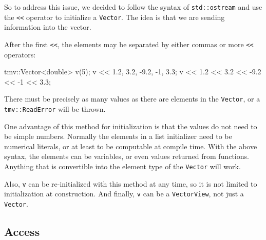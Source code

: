 \documentclass[twoside,letterpaper,11pt]{article}
\renewcommand{\tt}[1]{{\lstinline {#1}}}
\begin{document}
So to address this issue, we decided to follow the syntax of \tt{std::ostream}
and use the \tt{<<} operator to initialize a \tt{Vector}.  The idea is that we are 
sending information into the vector.  

After the first 
\tt{<<}, the elements may be separated by either commas or more \tt{<<}
operators:
\begin{tmvcode}
tmv::Vector<double> v(5);
v << 1.2, 3.2, -9.2, -1, 3.3;
v << 1.2 << 3.2 << -9.2 << -1 << 3.3;
\end{tmvcode}
There must be precisely as many values as there are elements in the \tt{Vector},
or a \tt{tmv::ReadError} will be thrown.

One advantage of this method for initialization is that the values do not need to be simple numbers.
Normally the elements in a list initializer need to be numerical literals, or at least to be 
computable at compile time.
With the above syntax, the elements can be variables, 
or even values returned from functions.  Anything that is convertible
into the element type of the \tt{Vector} will work.

Also, \tt{v} can be re-initialized with this method at any time, so it is not limited to 
initialization at construction.  And finally, \tt{v} can be a \tt{VectorView}, not just a \tt{Vector}.

\subsection{Access}
\label{Vector_Access}
\end{document}
